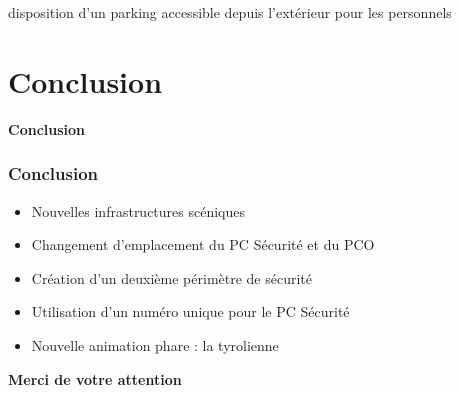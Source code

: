 \documentclass[xcolor=table]{beamer}
\begin{document}
\begin{frame}
\begin{itemize}
disposition d’un parking accessible depuis l’extérieur pour les personnels
\end{itemize}

\end{frame}

\section{Conclusion}

\begin{frame}

\centering\Huge{\textbf{Conclusion}}

\end{frame}

\begin{frame}

\frametitle{Conclusion}
\begin{itemize}
\item Nouvelles infrastructures scéniques
\vspace{2mm}
\item Changement d'emplacement du PC Sécurité et du PCO
\vspace{2mm}
\item Création d'un deuxième périmètre de sécurité
\vspace{2mm}
\item Utilisation d'un numéro unique pour le PC Sécurité
\vspace{2mm}
\item Nouvelle animation phare : la tyrolienne
\end{itemize}

\end{frame}

\begin{frame}
\centering\huge{\textbf{Merci de votre attention}}
\vspace{1cm}
\begin{Parallel}{.5\textwidth}{.5\textwidth}
\end{Parallel}

\end{frame}
\end{document}
